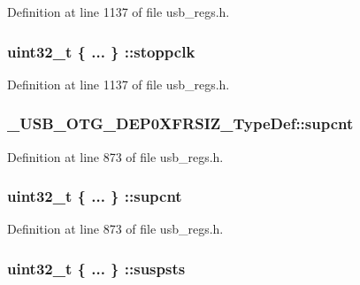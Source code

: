 Definition at line 1137 of file usb\-\_\-regs.\-h.

\hypertarget{group___u_s_b___o_t_g___d_r_i_v_e_r_gad1f6b697f134d1e206b8977a715070e1}{
\subsubsection[{stoppclk}]{\setlength{\rightskip}{0pt plus 5cm}uint32\-\_\-t \{ ... \} \-::stoppclk}}\label{group___u_s_b___o_t_g___d_r_i_v_e_r_gad1f6b697f134d1e206b8977a715070e1}


Definition at line 1137 of file usb\-\_\-regs.\-h.

\hypertarget{group___u_s_b___o_t_g___d_r_i_v_e_r_ga102cb1f6b08dacfa40ee191b386a42e1}{
\subsubsection[{supcnt}]{ \-\_\-\-U\-S\-B\-\_\-\-O\-T\-G\-\_\-\-D\-E\-P0\-X\-F\-R\-S\-I\-Z\-\_\-\-Type\-Def\-::supcnt}}\label{group___u_s_b___o_t_g___d_r_i_v_e_r_ga102cb1f6b08dacfa40ee191b386a42e1}


Definition at line 873 of file usb\-\_\-regs.\-h.

\hypertarget{group___u_s_b___o_t_g___d_r_i_v_e_r_ga7cc629c9ecdaf3ab15d144a4557d89c0}{
\subsubsection[{supcnt}]{\setlength{\rightskip}{0pt plus 5cm}uint32\-\_\-t \{ ... \} \-::supcnt}}\label{group___u_s_b___o_t_g___d_r_i_v_e_r_ga7cc629c9ecdaf3ab15d144a4557d89c0}


Definition at line 873 of file usb\-\_\-regs.\-h.

\hypertarget{group___u_s_b___o_t_g___d_r_i_v_e_r_gaa3c9f1d6242d7b09c9b5eb392eb6373d}{
\subsubsection[{suspsts}]{\setlength{\rightskip}{0pt plus 5cm}uint32\-\_\-t \{ ... \} \-::suspsts}}\label{group___u_s_b___o_t_g___d_r_i_v_e_r_gaa3c9f1d6242d7b09c9b5eb392eb6373d}


